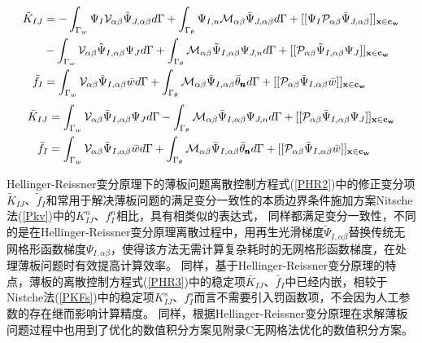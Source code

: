 \begin{subequations}\label{PHR2}
\begin{align}
    \label{PHR21} \tilde{K}_{IJ}&=-\int_{\Gamma_w}\Psi_I\mathcal{V}_{\alpha\beta}\tilde{\Psi}_{J,\alpha\beta}d\Gamma+\int_{\Gamma_{\theta}}\Psi_{I,n}\mathcal{M}_{\alpha\beta}\tilde{\Psi}_{J,\alpha\beta}d\Gamma+[[\Psi_I\mathcal{P}_{\alpha\beta}\tilde{\Psi}_{J,\alpha\beta}]]_{\bf{x}\in{c_w}}\nonumber\\
    &-\int_{\Gamma_w}\mathcal{V}_{\alpha\beta}\tilde{\Psi}_{I,\alpha\beta}\Psi_Jd\Gamma+\int_{\Gamma_{\theta}}\mathcal{M}_{\alpha\beta}\tilde{\Psi}_{I,\alpha\beta}\Psi_{J,n}d\Gamma+[[\mathcal{P}_{\alpha\beta}\tilde{\Psi}_{I,\alpha\beta}\Psi_J]]_{\bf{x}\in{c_w}} \\
    \label{PHR22}   \tilde{f}_I&=\int_{\Gamma_w}\mathcal{V}_{\alpha\beta}\tilde{\Psi}_{I,\alpha\beta}\bar{w}d\Gamma+\int_{\Gamma_{\theta}}\mathcal{M}_{\alpha\beta}\tilde{\Psi}_{I,\alpha\beta}\bar{\theta}_{\pmb n}d\Gamma+[[\mathcal{P}_{\alpha\beta}\tilde{\Psi}_{I,\alpha\beta}\bar{w}]]_{\bf{x}\in{c_w}}
\end{align}
\end{subequations}
\begin{subequations}\label{PHR3}
\begin{align}
    \label{PHR31}   \bar{K}_{IJ}&=\int_{\Gamma_w}\mathcal{V}_{\alpha\beta}\bar{\Psi}_{I,\alpha\beta}\Psi_Jd\Gamma-\int_{\Gamma_{\theta}}\mathcal{M}_{\alpha\beta}\bar{\Psi}_{I,\alpha\beta}\Psi_{J,n}d\Gamma+[[\mathcal{P}_{\alpha\beta}\bar{\Psi}_{I,\alpha\beta}\Psi_J]]_{\bf{x}\in{c_w}}\\
    \label{PHR32}  \bar{f}_I&=\int_{\Gamma_w}\mathcal{V}_{\alpha\beta}\bar{\Psi}_{I,\alpha\beta}\bar{w}d\Gamma+\int_{\Gamma_{\theta}}\mathcal{M}_{\alpha\beta}\bar{\Psi}_{I,\alpha\beta}\bar{\theta}_{\pmb n}d\Gamma+[[\mathcal{P}_{\alpha\beta}\bar{\Psi}_{I,\alpha\beta}\bar{w}]]_{\bf{x}\in{c_w}}
\end{align}
\end{subequations}
\par
Hellinger-Reissner变分原理下的薄板问题离散控制方程式(\ref{PHR2})中的修正变分项$\tilde{K}_{IJ}$、$\tilde{f}_I$和常用于解决薄板问题的满足变分一致性的本质边界条件施加方案Nitsche法(\ref{Pkv})中的$K_{IJ}^n$、$f_I^n$相比，具有相类似的表达式，
同样都满足变分一致性，不同的是在Hellinger-Reissner变分原理离散过程中，用再生光滑梯度$\tilde{\Psi}_{I,\alpha\beta}$替换传统无网格形函数梯度$\Psi_{I,\alpha\beta}$，使得该方法无需计算复杂耗时的无网格形函数梯度，在处理薄板问题时有效提高计算效率。
同样，基于Hellinger-Reissner变分原理的特点，薄板的离散控制方程式(\ref{PHR3})中的稳定项$\bar{K}_{IJ}$、$\bar{f}_I$中已经内嵌，相较于Nistche法(\ref{PKFs})中的稳定项$K^s_{IJ}$、$f^s_I$而言不需要引入罚函数项，不会因为人工参数的存在继而影响计算精度。
同样，根据Hellinger-Reissner变分原理在求解薄板问题过程中也用到了优化的数值积分方案见附录C无网格法优化的数值积分方案。
